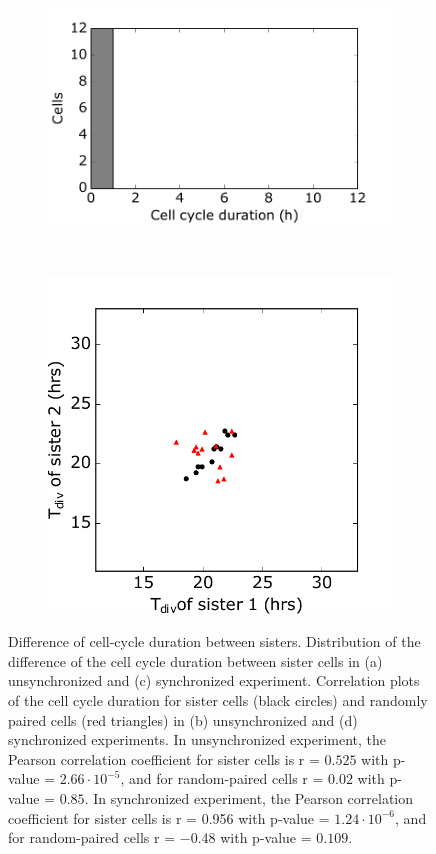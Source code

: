 \documentclass[pdftex,12pt,a4paper]{report}
\begin{document}
\begin{figure}[H]
\begin{subfigure}{.4\textwidth}
  \centering
  \includegraphics[width=\textwidth]{images/ccd_hist_syn.pdf}
  \caption{}
  \label{fig:ccd_hist_syn}
\end{subfigure}
~
\begin{subfigure}{.4\textwidth}
  \centering
  \includegraphics[width=\textwidth]{images/ccd_scatter_syn.pdf}
  \caption{}
  \label{fig:ccd_scatter_syn}
\end{subfigure}
\caption[Difference of cell-cycle duration between sisters]{Difference of cell-cycle duration between sisters. Distribution of the difference of the cell cycle duration between sister cells in (a) unsynchronized and (c) synchronized experiment. Correlation plots of the cell cycle duration for sister cells (black circles) and randomly paired cells (red  triangles) in (b) unsynchronized and (d) synchronized experiments. In unsynchronized experiment, the Pearson correlation coefficient for sister cells is r = $0.525$ with p-value = $2.66 \cdot 10^{-5}$, and for random-paired cells r = $0.02$ with p-value = $0.85$.  In synchronized experiment, the Pearson correlation coefficient for sister cells is r = 0.956 with p-value = $1.24 \cdot 10^{-6}$, and for random-paired cells r = $-0.48$ with p-value = $0.109$.}

\end{figure}
\end{document}
